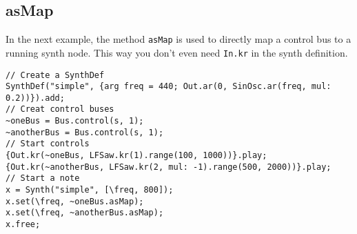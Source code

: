 \subsection{asMap}

In the next example, the method \texttt{asMap} is used to directly map a control bus to a running synth node. This way you don't even need \texttt{In.kr} in the synth definition.

\begin{lstlisting}[style=SuperCollider-IDE, basicstyle=\scttfamily\footnotesize]
// Create a SynthDef
SynthDef("simple", {arg freq = 440; Out.ar(0, SinOsc.ar(freq, mul: 0.2))}).add;
// Creat control buses
~oneBus = Bus.control(s, 1);
~anotherBus = Bus.control(s, 1);
// Start controls
{Out.kr(~oneBus, LFSaw.kr(1).range(100, 1000))}.play;
{Out.kr(~anotherBus, LFSaw.kr(2, mul: -1).range(500, 2000))}.play;
// Start a note
x = Synth("simple", [\freq, 800]);
x.set(\freq, ~oneBus.asMap);
x.set(\freq, ~anotherBus.asMap);
x.free;
\end{lstlisting}